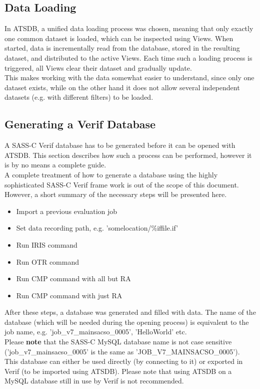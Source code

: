 \subsection*{Data Loading}
In ATSDB, a unified data loading process was chosen, meaning that only exactly one common dataset is loaded, which can be inspected using Views. When started, data is incrementally read from the database, stored in the resulting dataset, and distributed to the active Views. Each time such a loading process is triggered, all Views clear their dataset and gradually update. \\
This makes working with the data somewhat easier to understand, since only one dataset exists, while on the other hand it does not allow several independent datasets (e.g. with different filters) to be loaded.

\subsection*{Generating a Verif Database}
\label{sec:generation}

A SASS-C Verif database has to be generated before it can be opened with ATSDB.  This section describes how such
a process can be performed, however it is by no means a complete guide. \\

A complete treatment of how to generate a database using the highly sophisticated SASS-C Verif frame work  is  out  of  the  scope  of  this  document.   However, a short summary of the necessary steps will be presented here.\\

\begin{itemize}  
\item Import a previous evaluation job
\item Set data recording path, e.g. 'somelocation/\%iffile.if'
\item Run IRIS command
\item Run OTR command
\item Run CMP command with all but RA
\item Run CMP command with just RA
\end{itemize}

After  these  steps,  a  database  was  generated  and  filled  with  data.   The  name  of  the  database  (which
will  be  needed  during  the  opening  process)  is  equivalent  to  the  job  name,  e.g.   'job\_v7\_mainsacso\_0005', 'HelloWorld' etc. \\

Please \textbf{note} that the SASS-C MySQL database name is not case sensitive ('job\_v7\_mainsacso\_0005' is the same as 'JOB\_V7\_MAINSACSO\_0005'). \\
 
This database can either be used directly (by connecting to it) or exported in Verif (to be imported using ATSDB). Please note that using ATSDB on a MySQL database still in use by Verif is not recommended.
 
